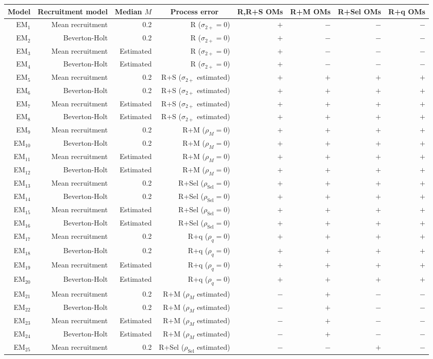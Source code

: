 \begin{center}
\begin{tabular}{rrrrrrrr}
\hline\hline
\multicolumn{1}{c}{Model}&\multicolumn{1}{c}{Recruitment model}&\multicolumn{1}{c}{Median $M$}&\multicolumn{1}{c}{Process error}&\multicolumn{1}{c}{R,R+S OMs}&\multicolumn{1}{c}{R+M OMs}&\multicolumn{1}{c}{R+Sel OMs}&\multicolumn{1}{c}{R+q OMs}\tabularnewline
\hline
EM$_{1}$&Mean recruitment&0.2&R ($\sigma_{2+} = 0$)&$+$&$-$&$-$&$-$\tabularnewline
EM$_{2}$&Beverton-Holt&0.2&R ($\sigma_{2+} = 0$)&$+$&$-$&$-$&$-$\tabularnewline
EM$_{3}$&Mean recruitment&Estimated&R ($\sigma_{2+} = 0$)&$+$&$-$&$-$&$-$\tabularnewline
EM$_{4}$&Beverton-Holt&Estimated&R ($\sigma_{2+} = 0$)&$+$&$-$&$-$&$-$\tabularnewline
EM$_{5}$&Mean recruitment&0.2&R+S ($\sigma_{2+}$ estimated)&$+$&$+$&$+$&$+$\tabularnewline
EM$_{6}$&Beverton-Holt&0.2&R+S ($\sigma_{2+}$ estimated)&$+$&$+$&$+$&$+$\tabularnewline
EM$_{7}$&Mean recruitment&Estimated&R+S ($\sigma_{2+}$ estimated)&$+$&$+$&$+$&$+$\tabularnewline
EM$_{8}$&Beverton-Holt&Estimated&R+S ($\sigma_{2+}$ estimated)&$+$&$+$&$+$&$+$\tabularnewline
EM$_{9}$&Mean recruitment&0.2&R+M ($\rho_{M} = 0$)&$+$&$+$&$+$&$+$\tabularnewline
EM$_{10}$&Beverton-Holt&0.2&R+M ($\rho_{M} = 0$)&$+$&$+$&$+$&$+$\tabularnewline
EM$_{11}$&Mean recruitment&Estimated&R+M ($\rho_{M} = 0$)&$+$&$+$&$+$&$+$\tabularnewline
EM$_{12}$&Beverton-Holt&Estimated&R+M ($\rho_{M} = 0$)&$+$&$+$&$+$&$+$\tabularnewline
EM$_{13}$&Mean recruitment&0.2&R+Sel ($\rho_{\text{Sel}} = 0$)&$+$&$+$&$+$&$+$\tabularnewline
EM$_{14}$&Beverton-Holt&0.2&R+Sel ($\rho_{\text{Sel}} = 0$)&$+$&$+$&$+$&$+$\tabularnewline
EM$_{15}$&Mean recruitment&Estimated&R+Sel ($\rho_{\text{Sel}} = 0$)&$+$&$+$&$+$&$+$\tabularnewline
EM$_{16}$&Beverton-Holt&Estimated&R+Sel ($\rho_{\text{Sel}} = 0$)&$+$&$+$&$+$&$+$\tabularnewline
EM$_{17}$&Mean recruitment&0.2&R+q ($\rho_{q} = 0$)&$+$&$+$&$+$&$+$\tabularnewline
EM$_{18}$&Beverton-Holt&0.2&R+q ($\rho_{q} = 0$)&$+$&$+$&$+$&$+$\tabularnewline
EM$_{19}$&Mean recruitment&Estimated&R+q ($\rho_{q} = 0$)&$+$&$+$&$+$&$+$\tabularnewline
EM$_{20}$&Beverton-Holt&Estimated&R+q ($\rho_{q} = 0$)&$+$&$+$&$+$&$+$\tabularnewline
EM$_{21}$&Mean recruitment&0.2&R+M ($\rho_{M}$ estimated)&$-$&$+$&$-$&$-$\tabularnewline
EM$_{22}$&Beverton-Holt&0.2&R+M ($\rho_{M}$ estimated)&$-$&$+$&$-$&$-$\tabularnewline
EM$_{23}$&Mean recruitment&Estimated&R+M ($\rho_{M}$ estimated)&$-$&$+$&$-$&$-$\tabularnewline
EM$_{24}$&Beverton-Holt&Estimated&R+M ($\rho_{M}$ estimated)&$-$&$+$&$-$&$-$\tabularnewline
EM$_{25}$&Mean recruitment&0.2&R+Sel ($\rho_{\text{Sel}}$ estimated)&$-$&$-$&$+$&$-$\tabularnewline

\end{tabular}
\end{center}
